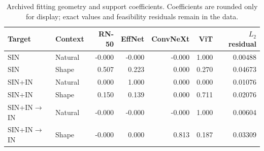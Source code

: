 \begin{table}[ht]
\caption{Archived fitting geometry and support coefficients. Coefficients are rounded only for display; exact values and feasibility residuals remain in the data.}
\label{tab:geometry-support}\centering\small
\begin{tabular}{llrrrrr}\toprule
Target & Context & RN-50 & EffNet & ConvNeXt & ViT & $L_2$ residual\\\midrule
SIN & Natural & -0.000 & -0.000 & -0.000 & 1.000 & 0.00488\\
SIN & Shape & 0.507 & 0.223 & 0.000 & 0.270 & 0.04673\\
SIN+IN & Natural & 0.000 & 1.000 & 0.000 & 0.000 & 0.01076\\
SIN+IN & Shape & 0.150 & 0.139 & 0.000 & 0.711 & 0.02076\\
SIN+IN$\to$IN & Natural & -0.000 & -0.000 & -0.000 & 1.000 & 0.00604\\
SIN+IN$\to$IN & Shape & -0.000 & 0.000 & 0.813 & 0.187 & 0.03309\\
\bottomrule\end{tabular}\end{table}